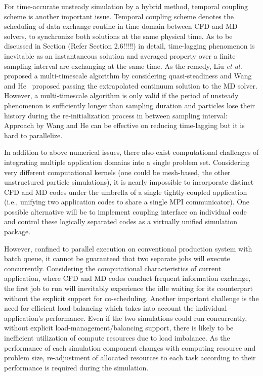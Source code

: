 \documentclass[preprint,12pt]{elsarticle}
\begin{document}
For time-accurate unsteady simulation by a hybrid method, temporal coupling scheme is another important issue. Temporal coupling scheme denotes the scheduling of data exchange routine in time domain between CFD and MD solvers, to synchronize both solutions at the same physical time. As to be discussed in Section (Refer Section 2.6!!!!!) in detail, time-lagging phenomenon is inevitable as an instantaneous solution and averaged property over a finite sampling interval are exchanging at the same time. As the remedy, Liu {\it{et al.}}~\cite{Liu} proposed a multi-timescale algorithm by considering quasi-steadiness and Wang and He~\cite{Wang} proposed passing the extrapolated continuum solution to the MD solver. However, a multi-timescale algorithm is only valid if the period of unsteady phenomenon is sufficiently longer than sampling duration and particles lose their history during the re-initialization process in between sampling interval: Approach by Wang and He can be effective on reducing time-lagging but it is hard to parallelize.


In addition to above numerical issues, there also exist computational challenges of integrating multiple application domains into a single problem set. Considering very different computational kernels (one could be mesh-based, the other unstructured particle simulations), it is nearly impossible to incorporate distinct CFD and MD codes under the umbrella of a single tightly-coupled application (i.e., unifying two application codes to share a single MPI communicator). One possible alternative will be to implement coupling interface on individual code and control these logically separated codes as a virtually unified simulation package.

However, confined to parallel execution on conventional production system with batch queue, it cannot be guaranteed that two separate jobs will execute concurrently. Considering the computational characteristics of current application, where CFD and MD codes conduct frequent information exchange, the first job to run will inevitably experience the idle waiting for its counterpart without the explicit support for co-scheduling. Another important challenge is the need for efficient load-balancing which takes into account the individual application's performance. Even if the two simulations could run concurrently, without explicit load-management/balancing support, there is likely to be inefficient utilization of compute resources due to load imbalance. As the performance of each simulation component changes with computing resource and problem size, re-adjustment of allocated resources to each task according to their performance is required during the simulation.
\end{document}
